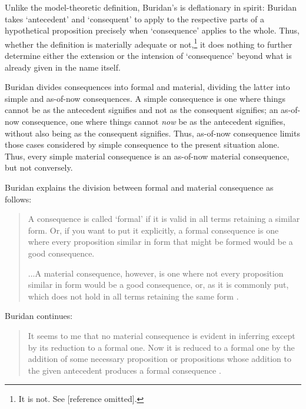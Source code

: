 \documentclass[]{article}
\begin{document}
Unlike the model-theoretic definition, Buridan's is deflationary in spirit: Buridan takes `antecedent' and `consequent' to apply to the respective parts of a hypothetical proposition precisely when `consequence' applies to the whole. Thus, whether the definition is materially adequate or not,\footnote{It is not. See [reference omitted].} it does nothing to further determine either the extension or the intension of `consequence' beyond what is already given in the name itself.

Buridan divides consequences into formal and material, dividing the latter into simple and as-of-now consequences. A simple consequence is one where things cannot be as the antecedent signifies and not as the consequent signifies; an as-of-now consequence, one where things cannot \textit{now} be as the antecedent signifies, without also being as the consequent signifies. Thus, as-of-now consequence limits those cases considered by simple consequence to the present situation alone. Thus, every simple material consequence is an as-of-now material consequence, but not conversely. 

Buridan explains the division between formal and material consequence as follows: 
\begin{quote}
A consequence is called `formal' if it is valid in all terms retaining a similar form. Or, if you want to put it explicitly, a formal consequence is one where every proposition similar in form that might be formed would be a good consequence.

...A material consequence, however, is one where not every proposition similar in form would be a good consequence, or, as it is commonly put, which does not hold in all terms retaining the same form \cite[TC I. 4, 68]{Buridan2015}.
\end{quote}

Buridan continues: 
\begin{quote}
It seems to me that no material consequence is evident in inferring except by its reduction to a formal one. Now it is reduced to a formal one by the addition of some necessary proposition or propositions whose addition to the given antecedent produces a formal consequence \cite[TC I. 4, p. 68]{Buridan2015}.
\end{quote}
\end{document}
